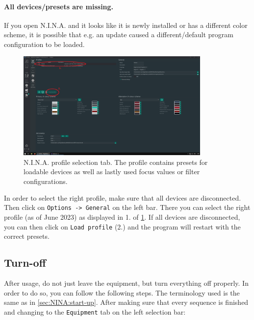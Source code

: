 \documentclass[a4paper, 11pt, fleqn]{memoir}
\begin{document}
\paragraph*{All devices/presets are missing.} If you open N.I.N.A. and it looks like it is newly installed or has a different color scheme, it is possible that e.g. an update caused a different/default program configuration to be loaded. 

\begin{figure}
    \centering
    \includegraphics[width=0.85\textwidth]{figures/NINA/change_profile_edited.png}
    \caption{N.I.N.A. profile selection tab. The profile contains presets for loadable devices as well as lastly used focus values or filter configurations.}
    \label{fig:NINA:change_profile_edited}
\end{figure}

In order to select the right profile, make sure that all devices are disconnected. Then click on  \texttt{Options -> General} on the left bar. There you can select the right profile (as of June 2023) as displayed in 1. of \ref{fig:NINA:change_profile_edited}. If all devices are disconnected, you can then click on \texttt{Load profile} (2.) and the program will restart with the correct presets.



\subsection{Turn-off}

After usage, do not just leave the equipment, but turn everything off properly. In order to do so, you can follow the following steps. The terminology used is the same as in \ref{sec:NINA:start-up}. After making sure that every sequence is finished and changing to the \texttt{Equipment} tab on the left selection bar:
\end{document}
